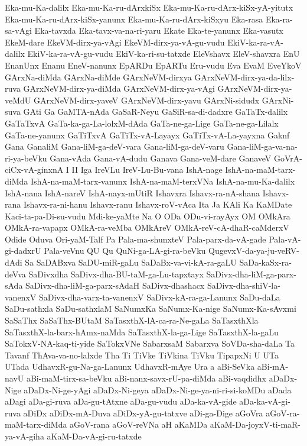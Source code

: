 {Eka-mu-Ka-dalilx
Eka-mu-Ka-ru-dArxkiSx
Eka-mu-Ka-ru-dArx-kiSx-yA-yitutx
Eka-mu-Ka-ru-dArx-kiSx-yanunx
Eka-mu-Ka-ru-dArx-kiSxyu
Eka-rasa
Eka-ra-sa-vAgi
Eka-tavxda
Eka-tavx-va-na-ri-yaru
Ekate
Eka-te-yanunx
Eka-vasutx
EkeM-dare
EkeVM-dirx-ya-vAgi
EkeVM-dirx-ya-vA-gu-vudu
EkiV-ka-ra-vA-dalilx
EkiV-ka-ra-vA-gu-vudu
EkiV-ka-ri-su-tatxde
EleVshavx
EleV-shavxra
EnU
EnanUnx
Enanu
EneV-nanunx
EpARDu
EpARTu
Eru-vudu
Eva
EvaM
EveYkoV
GArxNa-diMda
GArxNa-diMde
GArxNeVM-dirxya
GArxNeVM-dirx-ya-da-lilx-ruva
GArxNeVM-dirx-ya-diMda
GArxNeVM-dirx-ya-vAgi
GArxNeVM-dirx-ya-veMdU
GArxNeVM-dirx-yaveV
GArxNeVM-dirx-yavu
GArxNi-sidudx
GArxNi-suva
GAti
Ga
GaMTA-nAda
GaSaR-Neyu
GaSiR-sa-di-dadxre
GaTaTx-dalilx
GaTaTxvA
GaTa-ka-ga-La-lolxM-dAda
GaTa-ne-ga-Lige
GaTa-ne-ga-Lilalx
GaTa-ne-yanunx
GaTiTxvA
GaTiTx-vA-Layayx
GaTiTx-vA-La-yayxna
Gaknf
Gana
GanaliM
Gana-liM-ga-deV-vara
Gana-liM-ga-deV-varu
Gana-liM-ga-va-na-ri-ya-beVku
Gana-vAda
Gana-vA-dudu
Ganava
Gana-veM-dare
GanaveV
GoVrA-ciCx-vA-ginxnA
I
II
Iga
IreVLu
IreV-Lu-Bu-vana
IshA-nage
IshA-na-maM-tarx-diMda
IshA-na-maM-tarx-vanunx
IshA-na-maM-terxVNa
IshA-na-mu-Ka-dalilx
IshA-nana
IshA-nareV
IshA-nayx-mUtiR
Ishavxra
Ishavx-ra-nA-shana
Ishavx-rana
Ishavx-ra-ni-hanu
Ishavx-ranu
Ishavx-roV-vAca
Ita
Ja
KAli
Ka
KaMDate
Kaci-ta-pa-Di-su-vudu
Mdi-ke-yaMte
Na
O
ODa
ODu-vi-rayAyx
OM
OMkAra
OMkA-ra-vapapx
OMkA-ra-veMba
OMkAreV
OMkA-reV-cA-dhaR-caMderxV
Odide
Oduva
Ori-yaM-Talf
Pa
Pala-ma-shunxteV
Pala-parx-da-vA-gade
Pala-vA-gi-dadxrU
Pala-veVnu
QU
Qu
QuNi-ga-LA-gi-ra-beVku
QugevxV-da-ya-ju-veRV-dAdi
Sa
SaDABxva
SaDU-miR-gaLu
SaDaBx-va-vi-kA-ra-gaLU
SaDa-kaSx-ra-deVva
SaDivxdha
SaDivx-dha-BU-taM-ga-Lu-tapxtayx
SaDivx-dha-liM-ga-parx-sAda
SaDivx-dha-liM-ga-parx-sAdaH
SaDivx-dhashacx
SaDivx-dha-shiV-la-vanenxV
SaDivx-dha-varx-ta-vanenxV
SaDivx-kA-ra-ga-Lanunx
SaDu-daLa
SaDu-sathxla
SaDu-sathxlaM
SaNumxKa
SaNumx-Ka-nige
SaNumx-Ka-sAvxmi
SaSaThx
SaSaThx-BUtaM
SaTasxthX-lA-ca-ra-Ne-gaLa
SaTasxthXla
SaTasxthX-la-barx-hAmx-naMda
SaTasxthX-la-ga-Lige
SaTasxthX-la-gaLu
SaTokxV-NA-kaq-ti-yide
SaTokxVNe
SabarxsaM
Sabarxva
SoVDa-sha-daLa
Ta
Tavanf
ThAva-va-no-lalxde
Tha
Ti
TiVke
TiVkina
TiVku
TipapxNi
U
UTa
UTada
UdhavxR-gu-Na-ga-Lanunx
UdhavxR-mAye
Ura
a
aBi-SeVka
aBi-mA-navU
aBi-maM-tirx-sa-beVku
aBi-nanx-savx-rU-pa-diMda
aBi-vaqdidhx
aDaDx-Nige
aDaDx-Ni-ge-yAgi
aDaDx-Ni-geya
aDaDx-Ni-ge-ya-ni-ri-si-koMDu
aDada
aDagi
aDa-gi-ruva
aDa-gu-tAtxne
aDa-gu-vudu
aDa-ka-vA-gide
aDa-ka-vA-gi-ruva
aDiDx
aDiDx-mA-Duva
aDiDx-yA-gu-tatxve
aDi-ga-Dige
aGoVra
aGoV-ra-maM-tarx-diMda
aGoV-rana
aGoV-reVNa
aH
aKaMDa
aKaM-Da-joyxV-ti-maR-ya-vA-giha
aKaM-Da-vA-gi-ru-tatxde
}
